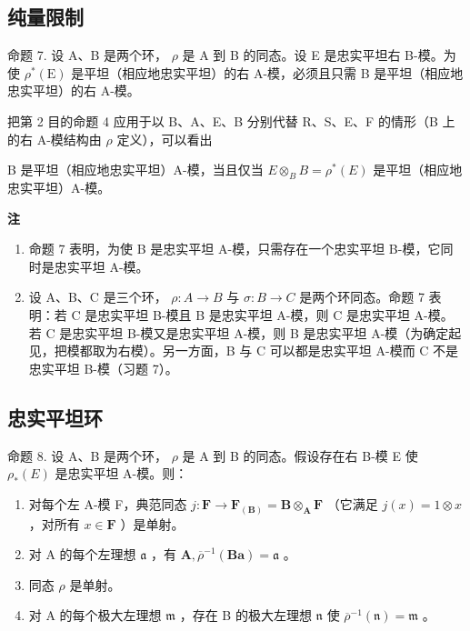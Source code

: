 \subsection{纯量限制}

命题 7. 设 A、B 是两个环， \(\rho\) 是 A 到 B 的同态。设 E 是忠实平坦右 B-模。为使 \(\rho^{*}(\mathrm{E})\) 是平坦（相应地忠实平坦）的右 A-模，必须且只需 B 是平坦（相应地忠实平坦）的右 A-模。

把第 2 目的命题 4 应用于以 B、A、E、B 分别代替 R、S、E、F 的情形（B 上的右 A-模结构由 \(\rho\) 定义），可以看出

B 是平坦（相应地忠实平坦）A-模，当且仅当 \(E \otimes_{B} B = \rho^{*}(E)\) 是平坦（相应地忠实平坦）A-模。

\textbf{注}\par

\begin{enumerate}
\def\labelenumi{(\arabic{enumi})}
\item
  命题 7 表明，为使 B 是忠实平坦 A-模，只需存在一个忠实平坦 B-模，它同时是忠实平坦 A-模。
\item
  设 A、B、C 是三个环， \(\rho: A \rightarrow B\) 与 \(\sigma: B \rightarrow C\) 是两个环同态。命题 7 表明：若 C 是忠实平坦 B-模且 B 是忠实平坦 A-模，则 C 是忠实平坦 A-模。若 C 是忠实平坦 B-模又是忠实平坦 A-模，则 B 是忠实平坦 A-模（为确定起见，把模都取为右模）。另一方面，B 与 C 可以都是忠实平坦 A-模而 C 不是忠实平坦 B-模（习题 7）。
\end{enumerate}

\subsection{忠实平坦环}

命题 8. 设 A、B 是两个环， \(\rho\) 是 A 到 B 的同态。假设存在右 B-模 E 使 \(\rho_{*}(E)\) 是忠实平坦 A-模。则：

\begin{enumerate}
\def\labelenumi{(\roman{enumi})}
\item
  对每个左 A-模 F，典范同态 \(j: \mathbf{F} \to \mathbf{F}_{(\mathbf{B})} = \mathbf{B} \otimes_{\mathbf{A}} \mathbf{F}\) （它满足 \(j(x) = 1 \otimes x\) ，对所有 \(x \in \mathbf{F}\) ）是单射。
\item
  对 A 的每个左理想 \(\mathfrak{a}\) ，有 \(\mathbf{A},\overline{\rho}^{-1}(\mathbf{Ba}) = \mathfrak{a}\) 。
\item
  同态 \(\rho\) 是单射。
\item
  对 A 的每个极大左理想 \(\mathfrak{m}\) ，存在 B 的极大左理想 \(\mathfrak{n}\) 使 \(\overline{\rho}^{-1}(\mathfrak{n}) = \mathfrak{m}\) 。
\end{enumerate}

